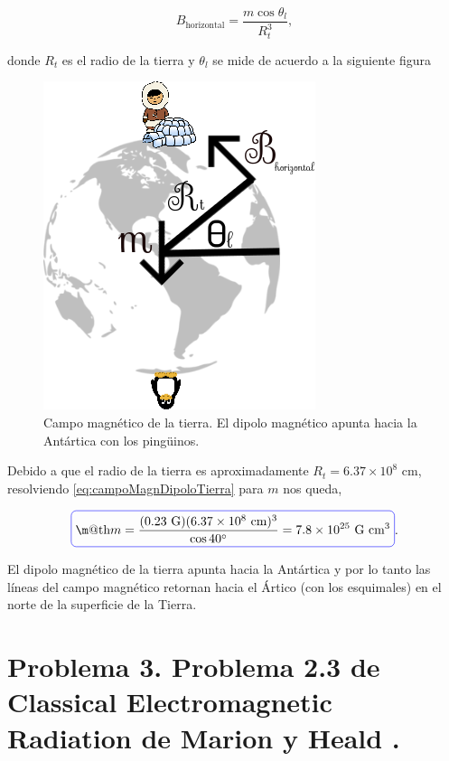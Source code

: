 \documentclass[a4paper,11pt]{article}
\makeatletter
\numberwithin{equation}{section}
\newcommand*{\boxcolor}{blue}
\renewcommand{\boxed}[1]{\textcolor{\boxcolor}{%
\tikz[baseline={([yshift=-1ex]current bounding box.center)}] \node [rectangle, minimum width=1ex,rounded corners,draw] {\normalcolor\m@th$\displaystyle#1$};}}
\makeatother
\begin{document}
\begin{equation}
 B_{\text{horizontal}} = \frac{m\cos{\theta_l}}{R_t^3},
 \label{eq:campoMagnDipoloTierra}
\end{equation}

  donde $R_t$ es el radio de la tierra y  $\theta_l$ se mide de acuerdo a la siguiente 
figura 


\begin{figure}[H]
 \center 
 \includegraphics[scale=0.5]{problema2fig1}
 \caption{Campo magnético de la tierra. El dipolo magnético apunta 
 hacia la Antártica con los pingüinos.}
 \label{fig:problema2fig1}
\end{figure}

Debido a que el radio de la tierra es aproximadamente $R_t = 6.37 \times 10^8$ cm, 
resolviendo \eqref{eq:campoMagnDipoloTierra} para $m$ nos queda, 

\begin{equation}
 \boxed{m = \frac{(0.23 \text{ G})(6.37 \times 10^8 \text{ cm})^3}{\cos{40^\circ}} = 
 7.8 \times 10^{25} \text{ G}\text{ cm}^3}.
\end{equation}

El dipolo magnético de la tierra apunta hacia la Antártica y por lo tanto las líneas 
del campo magnético retornan hacia el Ártico (con los esquimales) en el norte de la 
superficie de la Tierra.

\newpage

\section{Problema 3. Problema 2.3 de Classical Electromagnetic Radiation
de Marion y Heald \cite{marion2}.}
\end{document}
